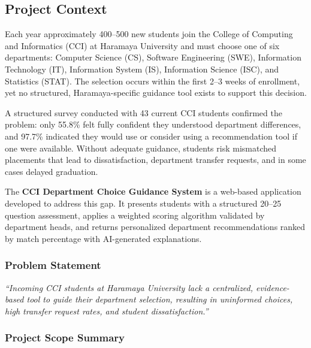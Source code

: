 ﻿\documentclass[12pt, a4paper]{article}
\begin{document}
\subsection{Project Context}

Each year approximately 400--500 new students join the College of Computing and Informatics (CCI) at Haramaya University and must choose one of six departments: Computer Science (CS), Software Engineering (SWE), Information Technology (IT), Information System (IS), Information Science (ISC), and Statistics (STAT). The selection occurs within the first 2--3 weeks of enrollment, yet no structured, Haramaya-specific guidance tool exists to support this decision.

A structured survey conducted with 43 current CCI students confirmed the problem: only 55.8\% felt fully confident they understood department differences, and 97.7\% indicated they would use or consider using a recommendation tool if one were available. Without adequate guidance, students risk mismatched placements that lead to dissatisfaction, department transfer requests, and in some cases delayed graduation.

The \textbf{CCI Department Choice Guidance System} is a web-based application developed to address this gap. It presents students with a structured 20--25 question assessment, applies a weighted scoring algorithm validated by department heads, and returns personalized department recommendations ranked by match percentage with AI-generated explanations.

\subsubsection*{Problem Statement}

\begin{tcolorbox}[
    enhanced, colback=lightblue, colframe=uniblue,
    arc=4pt, boxrule=1pt, top=6pt, bottom=6pt
]
\textit{``Incoming CCI students at Haramaya University lack a centralized, evidence-based tool to guide their department selection, resulting in uninformed choices, high transfer request rates, and student dissatisfaction.''}
\end{tcolorbox}

\subsubsection*{Project Scope Summary}
\end{document}
